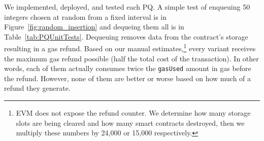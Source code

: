 We implemented, deployed, and tested each PQ. A simple test of enqueuing 50 integers chosen at random from a fixed interval is in Figure~\ref{fig:random_insertion} and dequeing them all is in Table~\ref{tab:PQUnitTests}.  Dequeuing removes data from the contract's storage resulting in a gas refund. Based on our manual estimates,\footnote{EVM does not expose the refund counter. We determine how many storage slots are being cleared and how many smart contracts destroyed, then we multiply these numbers by 24,000 or 15,000 respectively.} every variant receives the maximum gas refund possible (\ie half the total cost of the transaction). In other words, each of them actually consumes twice the \texttt{gasUsed} amount in gas before the refund. However, none of them are better or worse based on how much of a refund they generate.





%



